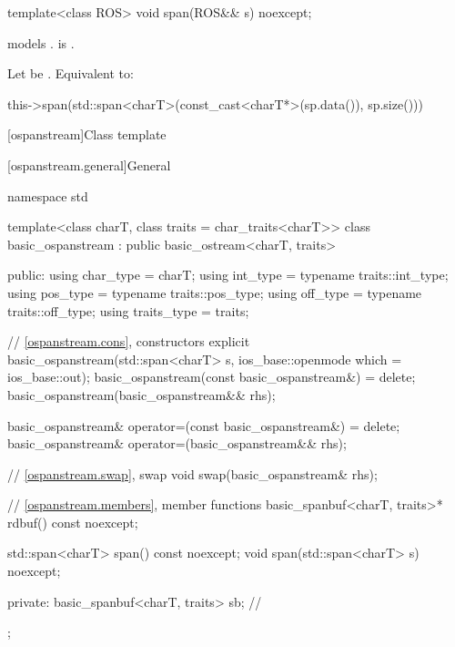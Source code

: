 \begin{itemdecl}
template<class ROS> void span(ROS&& s) noexcept;
\end{itemdecl}

\begin{itemdescr}
\pnum
\constraints
{} models .
is .

\pnum
\effects
Let  be .
Equivalent to:
\begin{codeblock}
this->span(std::span<charT>(const_cast<charT*>(sp.data()), sp.size()))
\end{codeblock}
\end{itemdescr}

[ospanstream]{Class template }

[ospanstream.general]{General}

%
\begin{codeblock}
namespace std {
  template<class charT, class traits = char_traits<charT>>
  class basic_ospanstream
    : public basic_ostream<charT, traits> {
  public:
    using char_type   = charT;
    using int_type    = typename traits::int_type;
    using pos_type    = typename traits::pos_type;
    using off_type    = typename traits::off_type;
    using traits_type = traits;

    // \ref{ospanstream.cons}, constructors
    explicit basic_ospanstream(std::span<charT> s,
                               ios_base::openmode which = ios_base::out);
    basic_ospanstream(const basic_ospanstream&) = delete;
    basic_ospanstream(basic_ospanstream&& rhs);

    basic_ospanstream& operator=(const basic_ospanstream&) = delete;
    basic_ospanstream& operator=(basic_ospanstream&& rhs);

    // \ref{ospanstream.swap}, swap
    void swap(basic_ospanstream& rhs);

    // \ref{ospanstream.members}, member functions
    basic_spanbuf<charT, traits>* rdbuf() const noexcept;

    std::span<charT> span() const noexcept;
    void span(std::span<charT> s) noexcept;

  private:
    basic_spanbuf<charT, traits> sb;    // \expos
  };
}
\end{codeblock}

